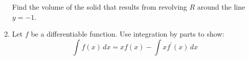 \documentclass[12pt]{article}
\newif\ifans
\begin{document}
\begin{enumerate}
 Find the volume of the solid that results from revolving $R$ around the line $y=-1$.

\ifans{\fbox{$\pi e$}} \fi

\item Let $f$ be a differentiable function. Use integration by parts to show: 
$$\int f(x) \,dx=xf(x)-\int x f^{\prime}(x) \,dx$$

\ifans{\fbox{\parbox{1\linewidth}{Consider $\int f(x) \,dx$.  Let $u=f(x)$ and $dv=dx$.  Then, $du=f^{\prime}(x)dx$ and $v=x$.  And, integration by parts yields $\int f(x) \,dx = xf(x)-\int x f^{\prime}(x) \,dx$, as desired.}}} \fi

\end{enumerate}
\end{document}
